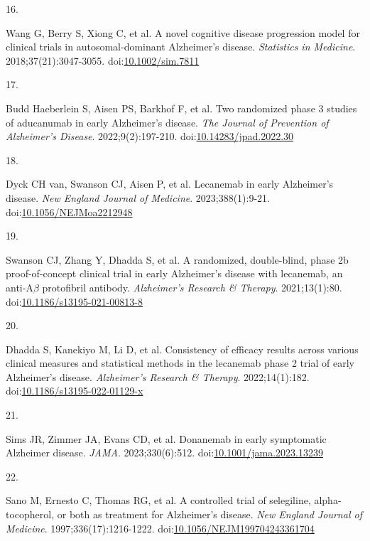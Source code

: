 \documentclass[
  11pt,
]{article}
\newlength{\cslhangindent}
\newlength{\csllabelwidth}
\newenvironment{CSLReferences}[2] %
 {\begin{list}{}{%
  \setlength{\itemindent}{0pt}
  \setlength{\leftmargin}{0pt}
  \setlength{\parsep}{0pt}
  \ifodd #1
   \setlength{\leftmargin}{\cslhangindent}
   \setlength{\itemindent}{-1\cslhangindent}
  \fi
  \setlength{\itemsep}{#2\baselineskip}}}
 {\end{list}}
\newcommand{\CSLLeftMargin}[1]{\parbox[t]{\csllabelwidth}{\strut#1\strut}}
\newcommand{\CSLRightInline}[1]{\parbox[t]{\linewidth - \csllabelwidth}{\strut#1\strut}}
\begin{document}
\begin{CSLReferences}{0}{1}
\CSLLeftMargin{16. }%
\CSLRightInline{Wang G, Berry S, Xiong C, et al. A novel cognitive disease progression model for clinical trials in autosomal-dominant {Alzheimer's} disease. \emph{Statistics in Medicine}. 2018;37(21):3047-3055. doi:\href{https://doi.org/10.1002/sim.7811}{10.1002/sim.7811}}

\CSLLeftMargin{17. }%
\CSLRightInline{Budd Haeberlein S, Aisen PS, Barkhof F, et al. Two randomized phase 3 studies of aducanumab in early {Alzheimer's} disease. \emph{The Journal of Prevention of Alzheimer's Disease}. 2022;9(2):197-210. doi:\href{https://doi.org/10.14283/jpad.2022.30}{10.14283/jpad.2022.30}}

\CSLLeftMargin{18. }%
\CSLRightInline{{Dyck CH van, Swanson CJ, Aisen P, et al.} Lecanemab in early {Alzheimer's} disease. \emph{New England Journal of Medicine}. 2023;388(1):9-21. doi:\href{https://doi.org/10.1056/NEJMoa2212948}{10.1056/NEJMoa2212948}}

\CSLLeftMargin{19. }%
\CSLRightInline{{Swanson CJ, Zhang Y, Dhadda S, et al.} A randomized, double-blind, phase 2b proof-of-concept clinical trial in early {Alzheimer's} disease with lecanemab, an anti-{A\(\beta\)} protofibril antibody. \emph{Alzheimer's Research \& Therapy}. 2021;13(1):80. doi:\href{https://doi.org/10.1186/s13195-021-00813-8}{10.1186/s13195-021-00813-8}}

\CSLLeftMargin{20. }%
\CSLRightInline{Dhadda S, Kanekiyo M, Li D, et al. Consistency of efficacy results across various clinical measures and statistical methods in the lecanemab phase 2 trial of early {Alzheimer's} disease. \emph{Alzheimer's Research \& Therapy}. 2022;14(1):182. doi:\href{https://doi.org/10.1186/s13195-022-01129-x}{10.1186/s13195-022-01129-x}}

\CSLLeftMargin{21. }%
\CSLRightInline{{Sims JR, Zimmer JA, Evans CD, et al.} Donanemab in early symptomatic {Alzheimer} disease. \emph{JAMA}. 2023;330(6):512. doi:\href{https://doi.org/10.1001/jama.2023.13239}{10.1001/jama.2023.13239}}

\CSLLeftMargin{22. }%
\CSLRightInline{Sano M, Ernesto C, Thomas RG, et al. A controlled trial of selegiline, alpha-tocopherol, or both as treatment for {Alzheimer's} disease. \emph{New England Journal of Medicine}. 1997;336(17):1216-1222. doi:\href{https://doi.org/10.1056/NEJM199704243361704}{10.1056/NEJM199704243361704}}


\end{CSLReferences}
\end{document}
